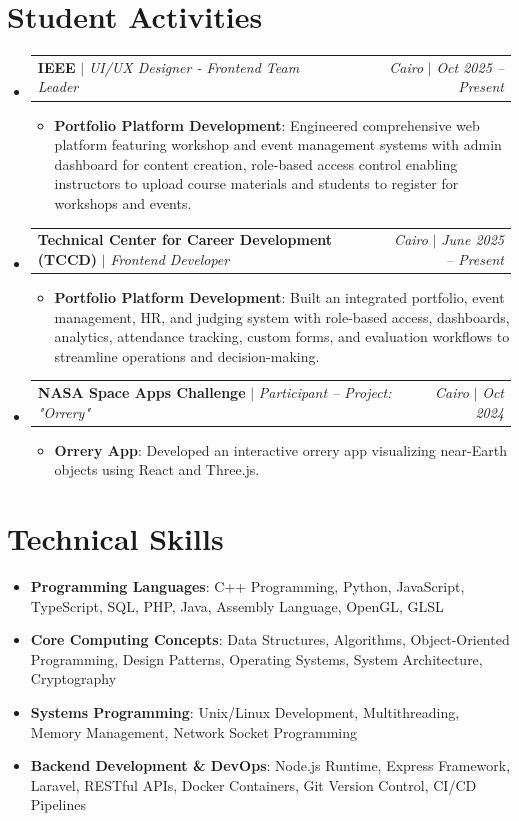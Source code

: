 \documentclass[letterpaper,11pt]{article}
\makeatletter
\newcommand{\resumeItem}[2]{\item\small{\textbf{#1}{: #2 \vspace{-2pt}}}}
\newcommand{\resumeActivitySubheading}[4]{
  \vspace{-1pt}\item
    \begin{tabular*}{0.97\textwidth}{l@{\extracolsep{\fill}}r}
      \textbf{#1} $|$ \textit{\small#3} & \textit{\small#2} $|$ \textit{\small #4} \\
    \end{tabular*}\vspace{-5pt}
}
\newcommand{\resumeSubHeadingListStart}{\begin{itemize}[leftmargin=*]}
\newcommand{\resumeSubHeadingListEnd}{\end{itemize}}
\newcommand{\resumeItemListStart}{\begin{itemize}}
\newcommand{\resumeItemListEnd}{\end{itemize}\vspace{-5pt}}
\makeatother
\begin{document}
\section{Student Activities}
  \resumeSubHeadingListStart
    \resumeActivitySubheading
      {IEEE}{Cairo}{UI/UX Designer - Frontend Team Leader}{Oct 2025 -- Present}
      \resumeItemListStart
        \resumeItem{Portfolio Platform Development}
          {Engineered comprehensive web platform featuring workshop and event management systems with admin dashboard for content creation, role-based access control enabling instructors to upload course materials and students to register for workshops and events.}
      \resumeItemListEnd
    \vspace{4pt}
    \resumeActivitySubheading
      {Technical Center for Career Development (TCCD)}{Cairo}{Frontend Developer}{June 2025 -- Present}
      \resumeItemListStart
        \resumeItem{Portfolio Platform Development}
          {Built an integrated portfolio, event management, HR, and judging system with role-based access, dashboards, analytics, attendance tracking, custom forms, and evaluation workflows to streamline operations and decision-making.}
      \resumeItemListEnd
    \vspace{4pt}
    \resumeActivitySubheading
      {NASA Space Apps Challenge}{Cairo}{Participant -- Project: "Orrery"}{Oct 2024}
      \resumeItemListStart
        \resumeItem{Orrery App}
          {Developed an interactive orrery app visualizing near-Earth objects using React and Three.js.}
      \resumeItemListEnd
  \resumeSubHeadingListEnd
\section{Technical Skills}
 \resumeSubHeadingListStart
    \item{\textbf{Programming Languages}{: C++ Programming, Python, JavaScript, TypeScript, SQL, PHP, Java, Assembly Language, OpenGL, GLSL}}
    \item{\textbf{Core Computing Concepts}{: Data Structures, Algorithms, Object-Oriented Programming, Design Patterns, Operating Systems, System Architecture, Cryptography}}
    \item{\textbf{Systems Programming}{: Unix/Linux Development, Multithreading, Memory Management, Network Socket Programming}}
    \item{\textbf{Backend Development \& DevOps}{: Node.js Runtime, Express Framework, Laravel, RESTful APIs, Docker Containers, Git Version Control, CI/CD Pipelines}}
 \resumeSubHeadingListEnd
\end{document}
